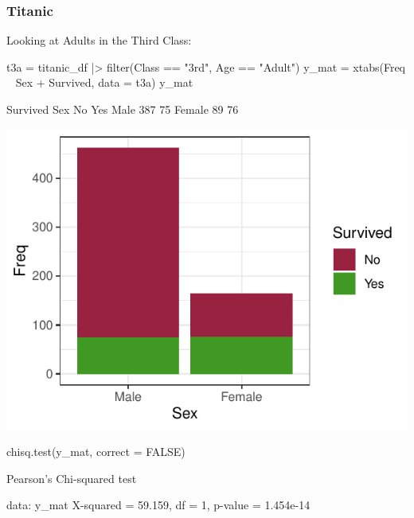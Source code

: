 \documentclass[a4paper]{article}
\begin{document}
\subsubsection{Titanic}
Looking at Adults in the Third Class:
\begin{Schunk}
\begin{Sinput}
t3a = titanic_df |> 
  filter(Class == "3rd", Age == "Adult")
y_mat = xtabs(Freq ~ Sex + Survived, data = t3a)
y_mat
\end{Sinput}
\begin{Soutput}
        Survived
Sex       No Yes
  Male   387  75
  Female  89  76
\end{Soutput}


{\centering \includegraphics[width=\maxwidth]{figure/listings-unnamed-chunk-44-1} 

}

\begin{Sinput}
chisq.test(y_mat, correct = FALSE)
\end{Sinput}
\begin{Soutput}

	Pearson's Chi-squared test

data:  y_mat
X-squared = 59.159, df = 1, p-value = 1.454e-14
\end{Soutput}
\end{Schunk}
\end{document}
